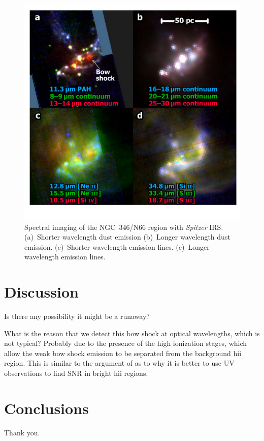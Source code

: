 \documentclass[twocolumn, times]{aastex631}
\begin{document}
\begin{figure}
  \centering
  \includegraphics[width=\linewidth]{figs/ngc346-spitzer-irs-multi-images}
  \caption{
    Spectral imaging of the NGC~346/N66 region with \textit{Spitzer} IRS.
    (a)~Shorter wavelength dust emission
    (b)~Longer wavelength dust emission.
    (c)~Shorter wavelength emission lines.
    (c)~Longer wavelength emission lines.
    }
  \label{fig:infrared-multipanel-irs}
\end{figure}





\section{Discussion}
\label{sec:discussion}

Is there any possibility it might be a runaway?

What is the reason that we detect this bow shock
at optical wavelengths, which is not typical?
Probably due to the presence of the high ionization stages,
which allow the weak bow shock emission to be
separated from the background hii region.
This is similar to the argument of \citep{Danforth:2003m}
as to why it is better to use UV observations to find SNR in
bright hii regions. 


\section{Conclusions}
\label{sec:conclusions}

\begin{acknowledgments}
  Thank you.
\end{acknowledgments}



\end{document}
